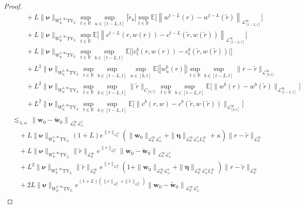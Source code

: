 \documentclass[11pt,oneside,english,reqno,dvipsnames,table]{amsart}
\numberwithin{equation}{section}
\theoremstyle{plain}
\theoremstyle{definition}
\theoremstyle{remark}
\theoremstyle{plain}
\theoremstyle{plain}
\theoremstyle{plain}
\theoremstyle{plain}
\theoremstyle{plain}
\theoremstyle{plain}
\theoremstyle{plain}
\newcommand{\TV}{\text{TV}}
\newcommand{\bw}{\mathbf{w}}
\newcommand{\mbE}{\mathbb{E}}
\newcommand{\mbR}{\mathbb{R}}
\newcommand{\msL}{\mathscr{L}}
\newcommand{\bmeta}{\boldsymbol{\eta}}
\newcommand{\bnu}{\boldsymbol{\nu}}
\numberwithin{thm}{section}
\begin{document}
\begin{proof}
\begin{align*}
    	&\qquad + L\|\bnu\|_{W^{1,\infty}_{\mbR}\TV_L} \sup_{t\in \mbR}\sup_{u\in [t-L,t]} |\tilde{r}_u|  \sup_{t\in \mbR} \mbE\Big[\left\|w^{t-L}(r) - w^{t-L}(\tilde{r})\right\|_{\msL^\infty_{[t-L,t]}}\Big]\\
    	&\qquad + L \|\bnu\|_{W^{1,\infty}_{\mbR}\TV_L} \sup_{t\in \mbR} \mbE\Big[\left\|c^{t-L}(r,w(r))-c^{t-L}(\tilde{r},w(\tilde{r}))\right\|_{\msL^\infty_{[t-L,t]}}\Big]\\
    	&\qquad + L \|\bnu\|_{W^{1,\infty}_{\mbR}\TV_L}\sup_{t\in \mbR}\sup_{b\in [t-L,t]} \mbE\Big[ \big|c^b_{t}(r,w(r))- c^b_t(\tilde{r},w(\tilde{r}))\big|\Big]\\
    	&\qquad + L^2 \|\bnu\|_{W^{1,\infty}_{\mbR}\TV_L} \sup_{t\in \mbR} \sup_{b\in [t-L,t]}\sup_{u\in [b,t]}\mbE\big[|w^b_u(r)|\big]  \sup_{t\in \mbR} \sup_{b\in [t-L,t]} \|r-\tilde{r}\|_{\msL^\infty_{[b,t]}}  \\
    	&\qquad +L^2\|\bnu\|_{W^{1,\infty}_{\mbR}\TV_L}\sup_{t\in \mbR} \sup_{b \in [t-L,t]}\|\tilde{r}\|_{C_{[b,t]}} \sup_{t\in \mbR} \sup_{b \in [t-L,t]}\mbE\Big[\big\|w^b(r)-w^b(\tilde{r})\big\|_{\msL^\infty_{[t-L,t]}}\Big] \\
    	&\qquad +L^2 \|\bnu\|_{W^{1,\infty}_{\mbR}\TV_L}\sup_{t\in \mbR}\sup_{b\in [t-L,t]} \mbE\Big[\big\|c^b(r,w)-c^b(\tilde{r},w(\tilde{r}))\big\|_{\msL^\infty_{[b,t]}}\Big] \\
    	&\lesssim_{\lambda,\kappa}  \, \left\|\bw_{0} - \tilde{\bw}_{0}\right\|_{\msL^\infty_{\mbR}\msL^1_\omega} \\
    	&\quad + L \|\bnu\|_{W^{1,\infty}_{\mbR}\TV_L}  (1+L)e^{\|r\|_{\msL^\infty_\mbR}} \left(\|\bw_{0}\|_{\msL^\infty_{\mbR}\msL^1_\omega}+ \|\bmeta\|_{\msL^\infty_{\mbR} \msL^1_\omega L^\infty_{L}} +\kappa\right)\|r-\tilde{r}\|_{\msL^\infty_\mbR} \\
    	&\quad   +L\|\bnu\|_{W^{1,\infty}_{\mbR}\TV_L} \|\tilde{r}\|_{\msL^\infty_\mbR}   e^{\|r\|_{\msL^\infty_\mbR}}\left\|\bw_{0}-\tilde{\bw}_{0}\right\|_{\msL^\infty_\mbR \msL^1_\omega} \\
    	&\quad  +L^2\|\bnu\|_{W^{1,\infty}_{\mbR}\TV_L} \|\tilde{r}\|_{\msL^\infty_\mbR}  e^{ \|r\|_{\msL^\infty_\mbR}} \left(1+\|\bw_{0}\|_{\msL^\infty_{\mbR}\msL^1_\omega}+ \|\bmeta\|_{\msL^\infty_{\mbR} \msL^1_\omega L^\infty_{L}}\right) \|r-\tilde{r}\|_{\msL^\infty_\mbR}\\
    	&\quad +2L \|\bnu\|_{W^{1,\infty}_{\mbR}\TV_L} e^{(1+L)\left(\|r\|_{\msL^\infty_\mbR}+\|\tilde{r}\|_{\msL^\infty_\mbR}\right) }\left\|\bw_{0}-\tilde{\bw}_{0}\right\|_{\msL^\infty_\mbR \msL^1_\omega}\\

\end{align*}
\end{proof}
\end{document}
